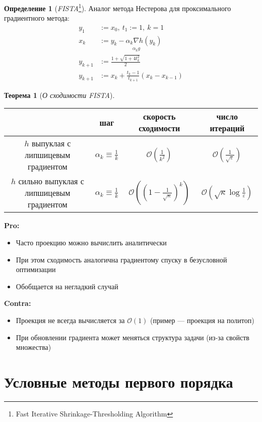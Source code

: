 \documentclass[11pt,a4paper]{report}
\def\eps{\varepsilon}
\theoremstyle{definition}
\theoremstyle{definition}
\newtheorem{theorem}{Теорема}[section]
\theoremstyle{definition}
\newtheorem*{definition}{Определение}
\begin{document}
	\begin{definition}[\textit{FISTA}\footnote{Fast Iterative Shrinkage-Thresholding Algorithm}]
		Аналог метода Нестерова для проксимального градиентного метода:
		\begin{align*}
			y_{1} &:= x_{0},\ t_{1} := 1,\ k = 1\\
			x_{k} &:= \underset{\alpha_k g}{y_k - \alpha_k \nabla h(y_k)}\\
			y_{k+1} &:= \frac{1 + \sqrt{1 + 4t_k^2}}{2}\\
			y_{k+1} &:= x_{k} + \frac{t_k - 1}{t_{k+1}}(x_k - x_{k-1})
		\end{align*}
	\end{definition}
	\begin{theorem}[\textit{О сходимости FISTA}]$  $\\
		\bgroup
		\def\arraystretch{1.5}
		\begin{tabular}{c|c|c|c}
			\hline 
			& шаг & скорость сходимости & число итераций\\
			\hline
			$ h $ выпуклая с липшицевым градиентом & $ \alpha_k \equiv \frac{1}{k} $ & $ \mathcal{O}\left (  \frac{1}{k^2} \right ) $ & $ \mathcal{O}\left (  \frac{1}{\sqrt{\eps}} \right ) $  \\
			\hline
			$ h $ сильно выпуклая с липшицевым градиентом & $ \alpha_k \equiv \frac{1}{k} $ & $ \mathcal{O}\left ( \left ( 1 - \frac{1}{\sqrt{\kappa}} \right )^{k} \right ) $ & $ \mathcal{O}(\sqrt{\kappa} \log \frac{1}{\eps}) $ \\
			\hline 
		\end{tabular}
		\egroup
	\end{theorem}
	\noindent \textbf{Pro:}
	\begin{itemize}[$\diamond$]
		\item Часто проекцию можно вычислить аналитически
		\item При этом сходимость аналогична градиентому спуску в безусловной оптимизации
		\item Обобщается на негладкий случай
	\end{itemize}
	\textbf{Contra:}
	\begin{itemize}[$\diamond$]
		\item Проекция не всегда вычисляется за $ \mathcal{O}(1) $ (пример — проекция на политоп)
		\item При обновлении градиента может меняться структура задачи (из-за свойств множества)
	\end{itemize}
	\section{Условные методы первого порядка}
\end{document}
